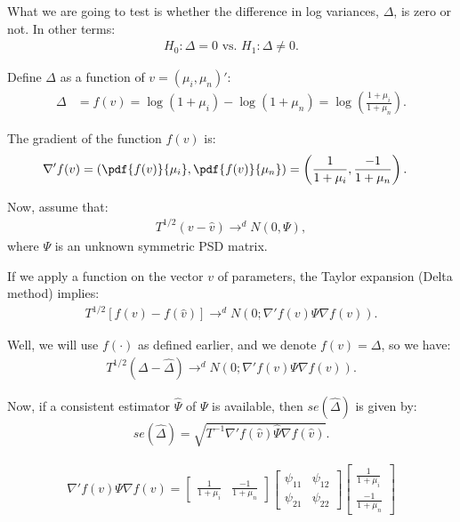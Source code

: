 \documentclass[12pt,oneside,a4paper]{article}
\begin{document}
What we are going to test is whether the difference in log variances, $\Delta$, is zero or not.
In other terms:
\begin{align*}
	H_{0}: \Delta=0 \text{ vs. } H_{1}: \Delta \neq 0.
\end{align*}

Define $\Delta$ as a function of $v = (\mu_{i}, \mu_{n})'$:
\begin{align*}
\Delta &= f(v) =
\log{(1+\mu_{i})} - \log{(1+\mu_{n})} =
\log\left( {\frac{1+\mu_{i}}{1+\mu_{n}}} \right).
\end{align*}

The gradient of the function $f(v)$ is:
\begin{align}
\nabla' f(v) &=
\left( 
\pdf{f(v)}{\mu_{i}},
\pdf{f(v)}{\mu_{n}}
\right) =
\left( 
\frac{1}{1+ \mu_{i}},
\frac{-1}{1+ \mu_{n}}
\right).
\end{align}

Now, assume that:
\begin{align}
	T^{1/2}(v - \hat{v}) \to^d N(0, \Psi),
\end{align}
where $\Psi$ is an unknown symmetric PSD matrix.

If we apply a function on the vector $v$ of parameters, the Taylor expansion (Delta method) implies:
\begin{align*}
	T^{1/2}[f(v) - f(\hat{v})] \to^d N \left( 0; \nabla'f(v) \Psi \nabla f(v)  \right).
\end{align*}

Well, we will use $f(\cdot)$ as defined earlier, and we denote $f(v) = \Delta$, so we have:
\begin{align*}
T^{1/2}(\Delta - \hat{\Delta}) 	\to^d N \left( 0; \nabla'f(v) \Psi \nabla f(v)  \right).
\end{align*}

Now, if a consistent estimator $\hat{\Psi}$ of $\Psi$ is available, then $se(\hat{\Delta})$ is given by:
\begin{align}
	se(\hat{\Delta}) = \sqrt{T^{-1} \nabla'f(\hat{v}) \hat{\Psi} \nabla f(\hat{v})}.
\end{align}

% 
\begin{align*}
\nabla'f(v) \Psi \nabla f(v)=
\begin{bmatrix} \frac{1}{1+ \mu_{i}} & \frac{-1}{1+ \mu_{n}} \end{bmatrix}
\begin{bmatrix}
\psi_{11} &  \psi_{12}
\\
\psi_{21} &  \psi_{22}
\end{bmatrix}
\begin{bmatrix} \frac{1}{1+ \mu_{i}} \\ \frac{-1}{1+ \mu_{n}} \end{bmatrix}
\end{align*}
\end{document}
